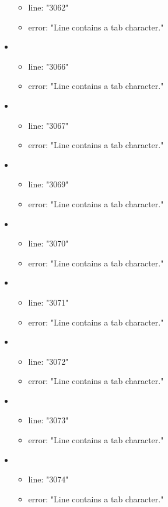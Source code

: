 \begin{itemize}
\begin{itemize}
		\item line: "3062" 
		\item error: "Line contains a tab character." 
	\end{itemize}
	\item 
	\begin{itemize} 
		\item line: "3066" 
		\item error: "Line contains a tab character." 
	\end{itemize}
	\item 
	\begin{itemize} 
		\item line: "3067" 
		\item error: "Line contains a tab character." 
	\end{itemize}
	\item 
	\begin{itemize} 
		\item line: "3069" 
		\item error: "Line contains a tab character." 
	\end{itemize}
	\item 
	\begin{itemize} 
		\item line: "3070" 
		\item error: "Line contains a tab character." 
	\end{itemize}
	\item 
	\begin{itemize} 
		\item line: "3071" 
		\item error: "Line contains a tab character." 
	\end{itemize}
	\item 
	\begin{itemize} 
		\item line: "3072" 
		\item error: "Line contains a tab character." 
	\end{itemize}
	\item 
	\begin{itemize} 
		\item line: "3073" 
		\item error: "Line contains a tab character." 
	\end{itemize}
	\item 
	\begin{itemize} 
		\item line: "3074" 
		\item error: "Line contains a tab character." 

\end{itemize}
\end{itemize}
